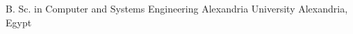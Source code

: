 

\begin{cventries}

  \cventry
    {B. Sc. in Computer and Systems Engineering} %
    {Alexandria University} %
    {Alexandria, Egypt} %
    {} %
    {}
\end{cventries}

